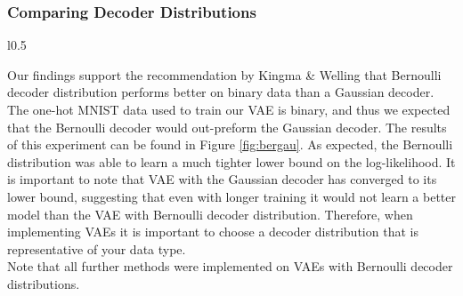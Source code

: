 \documentclass{article} %
\numberwithin{figure}{section}
\begin{document}
\subsubsection{Comparing Decoder Distributions}
\begin{wrapfigure}{l}{0.5\textwidth}
  \captionsetup[subfigure]{justification=centering}
  \resizebox{\linewidth}{!}{}
  \caption{Bernoulli v.s Gaussian decoder distributions}
  \label{fig:bergau}
\end{wrapfigure}
Our findings support the recommendation by Kingma \& Welling that Bernoulli decoder distribution performs better on binary data than a Gaussian decoder. The one-hot MNIST data used to train our VAE is binary, and thus we expected that the Bernoulli decoder would out-preform the Gaussian decoder. The results of this experiment can be found in Figure \ref{fig:bergau}. As expected, the Bernoulli distribution was able to learn a much tighter lower bound on the log-likelihood. It is important to note that VAE with the Gaussian decoder has converged to its lower bound, suggesting that even with longer training it would not learn a better model than the VAE with Bernoulli decoder distribution. Therefore, when implementing VAEs it is important to choose a decoder distribution that is representative of your data type. \\
Note that all further methods were implemented on VAEs with Bernoulli decoder distributions.
\end{document}
